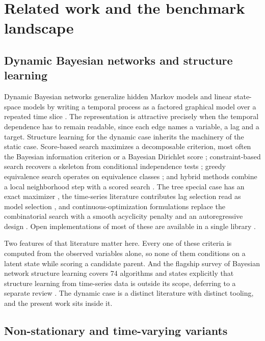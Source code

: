 \section{Related work and the benchmark landscape}
\label{sec:related}

\subsection{Dynamic Bayesian networks and structure learning}
\label{sec:related_dbn}

Dynamic Bayesian networks generalize hidden Markov models and linear state-space
models by writing a temporal process as a factored graphical model over a
repeated time slice \citep{dean1989model, murphy2002dbn}. The representation is
attractive precisely when the temporal dependence has to remain readable, since
each edge names a variable, a lag and a target. Structure learning for the
dynamic case inherits the machinery of the static case. Score-based search
maximizes a decomposable criterion, most often the Bayesian information criterion
or a Bayesian Dirichlet score \citep{heckerman1995learning}; constraint-based
search recovers a skeleton from conditional independence tests
\citep{spirtes2000causation}; greedy equivalence search operates on equivalence
classes \citep{chickering2002optimal}; and hybrid methods combine a local
neighborhood step with a scored search \citep{tsamardinos2006max}. The tree
special case has an exact maximizer \citep{chow1968approximating}, the
time-series literature contributes lag selection read as model selection
\citep{granger1969investigating}, and continuous-optimization formulations
replace the combinatorial search with a smooth acyclicity penalty and an
autoregressive design \citep{pamfil2020dynotears}. Open implementations of most
of these are available in a single library \citep{ankan2015pgmpy, ankan2024pgmpy}.

Two features of that literature matter here. Every one of these criteria is
computed from the observed variables alone, so none of them conditions on a
latent state while scoring a candidate parent. And the flagship survey of
Bayesian network structure learning covers 74 algorithms and states explicitly
that structure learning from time-series data is outside its scope, deferring to
a separate review \citep{kitson2023bnsurvey, nogueira2022cdtools}. The dynamic
case is a distinct literature with distinct tooling, and the present work sits
inside it.

\subsection{Non-stationary and time-varying variants}
\label{sec:related_nonstationary}

